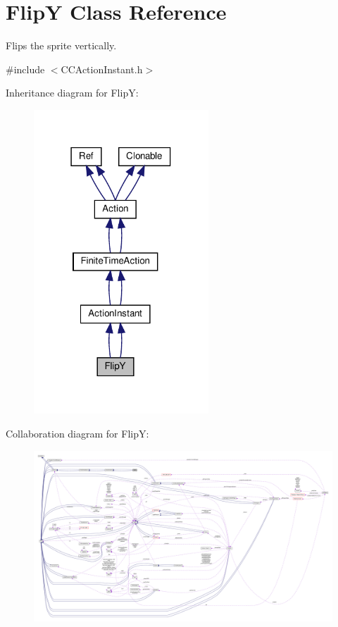 \hypertarget{classFlipY}{}\section{FlipY Class Reference}
\label{classFlipY}


Flips the sprite vertically.  




{\ttfamily \#include $<$C\+C\+Action\+Instant.\+h$>$}



Inheritance diagram for FlipY\+:
\nopagebreak
\begin{figure}[H]
\begin{center}
\leavevmode
\includegraphics[width=186pt]{classFlipY__inherit__graph}
\end{center}
\end{figure}


Collaboration diagram for FlipY\+:
\nopagebreak
\begin{figure}[H]
\begin{center}
\leavevmode
\includegraphics[width=350pt]{classFlipY__coll__graph}
\end{center}
\end{figure}
